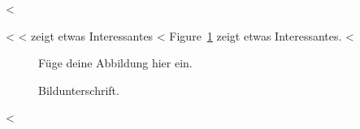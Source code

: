 <%

<%
<%
 zeigt etwas Interessantes
<%
Figure~\ref{fig:label} zeigt etwas Interessantes.
<%

\begin{figure}
  \centering
  Füge deine Abbildung hier ein.
  \caption{Bildunterschrift.}
  \label{fig:label}
\end{figure}
<%
